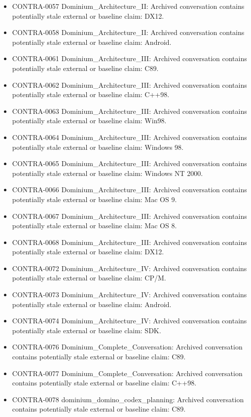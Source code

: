 \documentclass[11pt,a4paper]{report}
\begin{document}
\begin{itemize}
\item CONTRA-0057 Dominium\_Architecture\_II: Archived conversation contains potentially stale external or baseline claim: DX12.
\item CONTRA-0058 Dominium\_Architecture\_II: Archived conversation contains potentially stale external or baseline claim: Android.
\item CONTRA-0061 Dominium\_Architecture\_III: Archived conversation contains potentially stale external or baseline claim: C89.
\item CONTRA-0062 Dominium\_Architecture\_III: Archived conversation contains potentially stale external or baseline claim: C++98.
\item CONTRA-0063 Dominium\_Architecture\_III: Archived conversation contains potentially stale external or baseline claim: Win98.
\item CONTRA-0064 Dominium\_Architecture\_III: Archived conversation contains potentially stale external or baseline claim: Windows 98.
\item CONTRA-0065 Dominium\_Architecture\_III: Archived conversation contains potentially stale external or baseline claim: Windows NT 2000.
\item CONTRA-0066 Dominium\_Architecture\_III: Archived conversation contains potentially stale external or baseline claim: Mac OS 9.
\item CONTRA-0067 Dominium\_Architecture\_III: Archived conversation contains potentially stale external or baseline claim: Mac OS 8.
\item CONTRA-0068 Dominium\_Architecture\_III: Archived conversation contains potentially stale external or baseline claim: DX12.
\item CONTRA-0072 Dominium\_Architecture\_IV: Archived conversation contains potentially stale external or baseline claim: CP/M.
\item CONTRA-0073 Dominium\_Architecture\_IV: Archived conversation contains potentially stale external or baseline claim: Android.
\item CONTRA-0074 Dominium\_Architecture\_IV: Archived conversation contains potentially stale external or baseline claim: SDK.
\item CONTRA-0076 Dominium\_Complete\_Conversation: Archived conversation contains potentially stale external or baseline claim: C89.
\item CONTRA-0077 Dominium\_Complete\_Conversation: Archived conversation contains potentially stale external or baseline claim: C++98.
\item CONTRA-0078 dominium\_domino\_codex\_planning: Archived conversation contains potentially stale external or baseline claim: C89.

\end{itemize}
\end{document}
